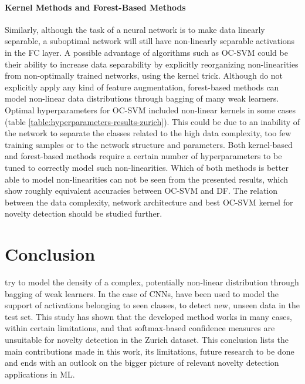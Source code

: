 \documentclass[10pt]{article}
\begin{document}
\paragraph{Kernel Methods and Forest-Based Methods} Similarly, although the task of a neural network is to make data linearly separable, a suboptimal network will still have non-linearly separable activations in the \gls{FC} layer. A possible advantage of algorithms such as \gls{OC-SVM} could be their ability to increase data separability by explicitly reorganizing non-linearities from non-optimally trained networks, using the kernel trick. Although  do not explicitly apply any kind of feature augmentation, forest-based methods can model non-linear data distributions through bagging of many weak learners.  Optimal hyperparameters for \gls{OC-SVM} included non-linear kernels in some cases (table \ref{table:hyperparameters-results-zurich}). This could be due to an inability of the network to separate the classes related to the high data complexity, too few training samples or to the network structure and parameters. Both kernel-based and forest-based methods require a certain number of hyperparameters to be tuned to correctly model such non-linearities. Which of both methods is better able to model non-linearities can not be seen from the presented results, which show roughly equivalent accuracies between \gls{OC-SVM} and \gls{DF}. The relation between the data complexity, network architecture and best \gls{OC-SVM} kernel for novelty detection should be studied further.

\pagebreak

\section{Conclusion}
\label{sec:conclusion}

 try to model the density of a complex, potentially non-linear distribution through bagging of weak learners. In the case of \glspl{CNN},  have been used to model the support of activations belonging to seen classes, to detect new, unseen data in the test set. This study has shown that the developed method works in many cases, within certain limitations, and that softmax-based confidence measures are unsuitable for novelty detection in the Zurich dataset. This conclusion lists the main contributions made in this work, its limitations, future research to be done and ends with an outlook on the bigger picture of relevant novelty detection applications in \gls{ML}.
\end{document}
